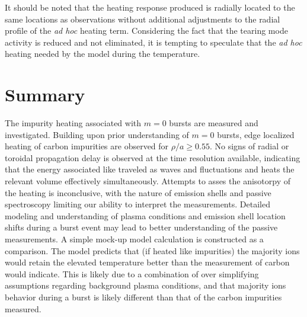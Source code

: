 \begin{refsection}
It should be noted that the heating response produced is radially located to the same locations as observations without additional adjustments to the radial profile of the \textit{ad hoc} heating term. Considering the fact that the tearing mode activity is reduced and not eliminated, it is tempting to speculate that the \textit{ad hoc} heating needed by the model during the temperature.

\section{Summary}

The impurity heating associated with $m = 0$ bursts are measured and investigated. Building upon prior understanding of $m = 0$ bursts, edge localized heating of carbon impurities are observed for $\rho/a \geq 0.55$. No signs of radial or toroidal propagation delay is observed at the time resolution available, indicating that the energy associated like traveled as waves and fluctuations and heats the relevant volume effectively simultaneously. Attempts to asses the anisotorpy of the heating is inconclusive, with the nature of emission shells and passive spectroscopy limiting our ability to interpret the measurements. Detailed modeling and understanding of plasma conditions and emission shell location shifts during a burst event may lead to better understanding of the passive measurements. A simple mock-up model calculation is constructed as a comparison. The model predicts that (if heated like impurities) the majority ions would retain the elevated temperature better than the measurement of carbon would indicate. This is likely due to a combination of over simplifying assumptions regarding background plasma conditions, and that majority ions behavior during a burst is likely different than that of the carbon impurities measured. 


\printbibliography%
\end{refsection}
